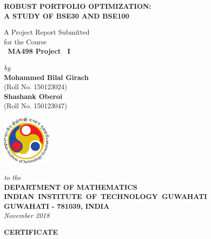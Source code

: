 \documentclass[12pt,a4paper]{report}
\theoremstyle{plain}
\theoremstyle{definition}
\theoremstyle{remark}
\begin{document}


\begin{titlepage}
\enlargethispage{3cm}

\begin{center}

\vspace*{-2cm}

\textbf{\Large ROBUST PORTFOLIO OPTIMIZATION:\\
A STUDY OF BSE30 AND BSE100}

\vfill

 A Project Report Submitted \\
for the Course \\[1cm]

{\bf\Large\ MA498 Project ~I }\\[.1in]

 \vfill

{\large \emph{by}}\\[5pt]
{\large\bf {Mohammed Bilal Girach}}\\[5pt]
{\large (Roll No. 150123024)} \\ [5pt]
{\large\bf {Shashank Oberoi}}\\[5pt]
{\large (Roll No. 150123047)}

\vfill
\includegraphics[height=2.5cm]{iitglogo}

\vspace*{0.5cm}

{\em\large to the}\\[10pt]
{\bf\large DEPARTMENT OF MATHEMATICS} \\[5pt]
{\bf\large \mbox{INDIAN INSTITUTE OF TECHNOLOGY GUWAHATI}}\\[5pt]
{\bf\large GUWAHATI - 781039, INDIA}\\[10pt]
{\it\large November 2018}
\end{center}

\end{titlepage}

\clearpage

 \setcounter{page}{2}
\begin{center}
{\Large{\bf{CERTIFICATE}}}
\end{center}
\end{document}
